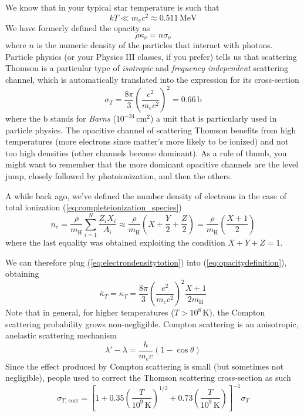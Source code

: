 We know that in your typical star temperature is such that
\begin{equation*}
	kT \ll m_{e}c^{2} \approx 0.511\,\text{MeV}
\end{equation*}
We have formerly defined the opacity as 
\begin{equation}
	\rho\kappa_{\nu} = n\sigma_{\nu}
	\label{eq:opacitydefinition}
\end{equation}
where $n$ is the numeric density of the particles that interact with photons. Particle physics (or your Physics III classes, if you prefer) tells us that scattering Thomson is a particular type of \emph{isotropic} and \emph{frequency independent} scattering channel, which is automatically translated into the expression for its cross-section
\begin{equation}
	\sigma_{T} = \frac{8\pi}{3}\left(\frac{e^{2}}{m_{e}c^{2}}\right)^{2} = 0.66\,\text{b}
	\label{eq:thomsoncrossection}
\end{equation}
where the $\text{b}$ stands for \emph{Barns} ($10^{-24}\,\text{cm}^{2}$) a unit that is particularly used in particle physics. The opacitive channel of scattering Thomson benefits from high temperatures (more electrons since matter's more likely to be ionized) and not too high densities (other channels become dominant). As a rule of thumb, you might want to remember that the more dominant opacitive channels are the level jump, closely followed by photoionization, and then the others.
\par A while back ago, we've defined the number density of electrons in the case of total ionization (\ref{eq:completeionization_species})
\begin{equation}
	n_{e} = \frac{\rho}{m_{\text{H}}}\sum_{i =1}^{N} \frac{Z_{i}X_{i}}{A_{i}} \approx \frac{\rho}{m_{\text{H}}} \left(X+\frac{Y}{2}+\frac{Z}{2}\right) =  \frac{\rho}{m_{\text{H}}} \left(\frac{X+1}{2}\right)
	\label{eq:electrondensitytotion}
\end{equation}
where the last equality was obtained exploiting the condition $X+Y+Z =1$.
\par We can therefore plug (\ref{eq:electrondensitytotion}) into (\ref{eq:opacitydefinition}), obtaining 
\begin{equation}
	\bar{\kappa}_{T} = \kappa_{T} = \frac{8\pi}{3}\left(\frac{e^{2}}{m_{e}c^{2}}\right)^{2}\frac{X+1}{2m_{\text{H}}}
	\label{eq:thomsonopacity}
\end{equation}
Note that in general, for higher temperatures ($T>10^{8}\,\text{K}$), the Compton scattering probability grows non-negligible. Compton scattering is an anisotropic, anelastic scattering mechanism
\begin{equation}
	\lambda'-\lambda = \frac{h}{m_{e}c}(1-\cos\theta)
	\label{eq:comptonscattering}
\end{equation}
Since the effect produced by Compton scattering is small (but sometimes not negligible), people used to correct the Thomson scattering cross-section as such 
\begin{equation*}
	\sigma_{T, \,\text{corr}} = \left[1+0.35\left(\frac{T}{10^{9}\,\text{K}}\right)^{1/2}+0.73\left(\frac{T}{10^{9}\,\text{K}}\right)\right]^{-1}\sigma_{T}
\end{equation*}


